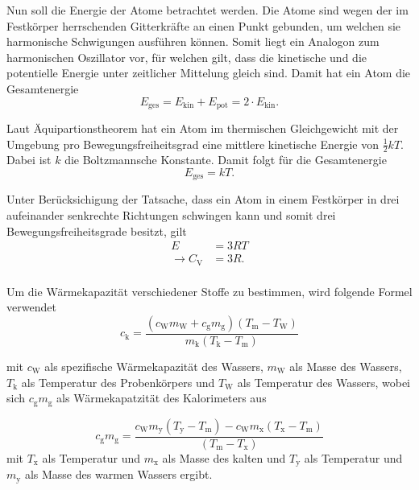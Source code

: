 Nun soll die Energie der Atome betrachtet werden. Die Atome sind wegen der im Festkörper herrschenden Gitterkräfte an einen Punkt gebunden, um welchen sie harmonische Schwigungen ausführen können. Somit liegt ein Analogon zum harmonischen Oszillator vor, für welchen gilt, dass die kinetische und die potentielle Energie unter zeitlicher Mittelung gleich sind. Damit hat ein Atom die Gesamtenergie
\begin{equation}
  E_\mathrm{ges} = E_\mathrm{kin} + E_\mathrm{pot} = 2 \cdot E_\mathrm{kin}.
\end{equation}

Laut Äquipartionstheorem hat ein Atom im thermischen Gleichgewicht mit der Umgebung pro Bewegungsfreiheitsgrad eine mittlere kinetische Energie von $\frac{1}{2}kT$. Dabei ist $k$ die Boltzmannsche Konstante. Damit folgt für die Gesamtenergie
\begin{equation}
    E_\mathrm{ges} = kT.
\end{equation}

Unter Berücksichigung der Tatsache, dass ein Atom in einem Festkörper in drei aufeinander senkrechte Richtungen schwingen kann und somit drei Bewegungsfreiheitsgrade besitzt, gilt
\begin{align}
  E &= 3RT \\
  \rightarrow C_\mathrm{V} &= 3R. \\
\end{align}

Um die Wärmekapazität verschiedener Stoffe zu bestimmen, wird folgende Formel verwendet
\begin{equation}
  \label{eqn:ck}
  c_\mathrm{k} = \frac{(c_\mathrm{W}m_\mathrm{W}+c_\mathrm{g}m_\mathrm{g})(T_\mathrm{m} - T_\mathrm{W})}{m_\mathrm{k}(T_\mathrm{k} - T_\mathrm{m})}
\end{equation}

mit $c_\mathrm{W}$ als spezifische Wärmekapazität des Wassers, $m_\mathrm{W}$ als Masse des Wassers, $T_\mathrm{k}$ als Temperatur des Probenkörpers und $T_\mathrm{W}$ als Temperatur des Wassers, wobei sich $c_\mathrm{g}m_\mathrm{g}$ als Wärmekapatzität des Kalorimeters aus

\begin{equation}
  \label{eqn:cgmg}
  c_\mathrm{g}m_\mathrm{g} = \frac{c_\mathrm{W}m_\mathrm{y}(T_\mathrm{y} - T_\mathrm{m}) - c_\mathrm{W}m_\mathrm{x}(T_\mathrm{x} - T_\mathrm{m})}{(T_\mathrm{m} - T_\mathrm{x})}
\end{equation}
mit $T_\mathrm{x}$ als Temperatur und $m_\mathrm{x}$ als Masse des kalten und $T_\mathrm{y}$ als Temperatur und $m_\mathrm{y}$ als Masse des warmen Wassers ergibt.

